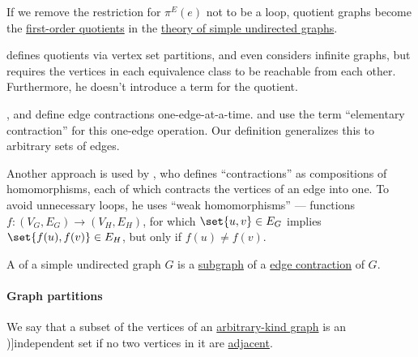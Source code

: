 \begin{comments}
  \item If we remove the restriction for \( \pi^E(e) \) not to be a loop, quotient graphs become the \hyperref[def:first_order_quotient]{first-order quotients} in the \hyperref[rem:theory_of_simple_undirected_graphs]{theory of simple undirected graphs}.

  \item {} defines quotients via vertex set partitions, and even considers infinite graphs, but requires the vertices in each equivalence class to be reachable from each other. Furthermore, he doesn't introduce a term for the quotient.

  \item {},  and  define edge contractions one-edge-at-a-time.  and  use the term \enquote{elementary contraction} for this one-edge operation. Our definition generalizes this to arbitrary sets of edges.

  \item Another approach is used by , who defines \enquote{contractions} as compositions of homomorphisms, each of which contracts the vertices of an edge into one. To avoid unnecessary loops, he uses \enquote{weak homomorphisms} --- functions \( f: (V_G, E_G) \to (V_H, E_H) \), for which \( \set{ u, v } \in E_G \) implies \( \set{ f(u), f(v) } \in E_H \), but only if \( f(u) \neq f(v) \).
\end{comments}

\begin{definition}\label{def:graph_minor}
  A  of a simple undirected graph \( G \) is a \hyperref[def:undirected_graph/subgraph]{subgraph} of a \hyperref[def:quotient_graph/edge]{edge contraction} of \( G \).
\end{definition}

\paragraph{Graph partitions}

\begin{definition}\label{def:graph_independent_set}
  We say that a subset of the vertices of an \hyperref[rem:arbitrary_kind_graph]{arbitrary-kind graph} is an \term[bg=независимо множество (\cite[103]{Мирчев2001})]{independent set} if no two vertices in it are \hyperref[def:graph_adjacency]{adjacent}.
\end{definition}

